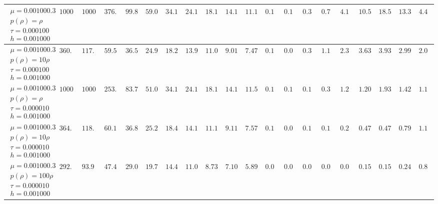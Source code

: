 \begin{landscape}
\begin{tabular}{*{19}{|c}|c}
\hline
$\begin{array}{c}\mu = 0.001000.3\\p(\rho) = \rho\\\tau = 0.000100\\h = 0.001000\end{array}$&$1000.000000$ &$1000.000000$ &$376.237700$ &$99.829900$ &$59.063100$ &$34.169400$ &$24.140300$ &$18.120000$ &$14.110400$ &$11.137700$ &$0.131900$ &$0.140800$ &$0.382800$ &$0.785100$ &$4.199100$ &$10.532700$ &$18.564600$ &$13.300600$ &$4.411800$ \\
\hline
$\begin{array}{c}\mu = 0.001000.3\\p(\rho) = 10\rho\\\tau = 0.000100\\h = 0.001000\end{array}$&$360.972700$ &$117.083000$ &$59.503600$ &$36.564100$ &$24.950900$ &$18.210100$ &$13.982500$ &$11.088500$ &$9.013400$ &$7.479800$ &$0.101500$ &$0.076400$ &$0.315200$ &$1.107000$ &$2.371000$ &$3.632400$ &$3.938600$ &$2.998400$ &$2.046800$ \\
\hline
$\begin{array}{c}\mu = 0.001000.3\\p(\rho) = \rho\\\tau = 0.000010\\h = 0.001000\end{array}$&$1000.000000$ &$1000.000000$ &$253.760460$ &$83.759530$ &$51.051680$ &$34.171690$ &$24.143430$ &$18.122250$ &$14.111910$ &$11.588780$ &$0.131460$ &$0.119010$ &$0.168660$ &$0.387270$ &$1.287880$ &$1.201130$ &$1.938770$ &$1.425300$ &$1.118410$ \\
\hline
$\begin{array}{c}\mu = 0.001000.3\\p(\rho) = 10\rho\\\tau = 0.000010\\h = 0.001000\end{array}$&$364.436580$ &$118.340620$ &$60.131290$ &$36.876860$ &$25.201030$ &$18.418570$ &$14.116010$ &$11.165840$ &$9.117170$ &$7.573180$ &$0.101170$ &$0.036660$ &$0.113480$ &$0.159590$ &$0.222480$ &$0.475110$ &$0.476940$ &$0.794620$ &$1.126900$ \\
\hline
$\begin{array}{c}\mu = 0.001000.3\\p(\rho) = 100\rho\\\tau = 0.000010\\h = 0.001000\end{array}$&$292.249960$ &$93.975200$ &$47.483650$ &$29.062900$ &$19.790460$ &$14.425510$ &$11.036270$ &$8.731840$ &$7.106180$ &$5.895650$ &$0.079300$ &$0.025920$ &$0.049430$ &$0.049990$ &$0.099940$ &$0.152870$ &$0.153000$ &$0.247650$ &$0.845430$ \\

\end{tabular}
\end{landscape}
